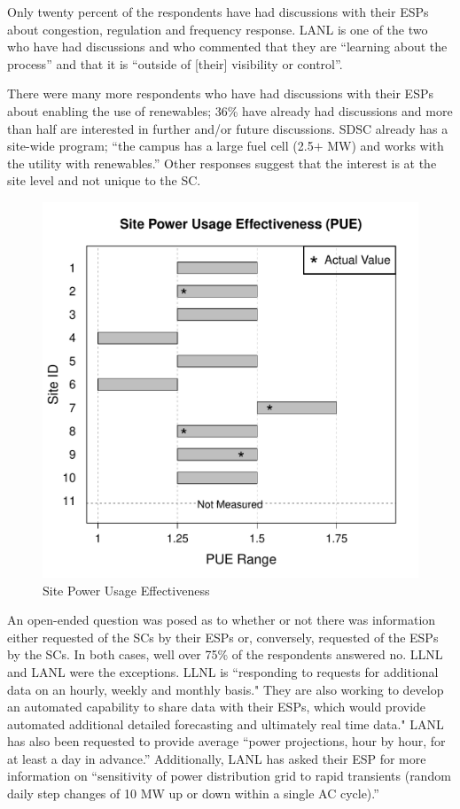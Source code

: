 Only twenty percent of the respondents have had discussions with their
ESPs about congestion, regulation and frequency
response. LANL is one of the two who have had discussions and who commented that
they are ``learning about the process'' and that it is ``outside of [their] visibility or control''.

There were many more respondents who have had discussions with their
ESPs about enabling the use of renewables; 36{\%}
have already had discussions and more than half are interested in further
and/or future discussions. SDSC already has a site-wide program; ``the
campus has a large fuel cell (2.5$+$ MW) and works with the utility with
renewables.'' Other responses suggest that the interest is at the site level
and not unique to the SC.

\begin{figure}
\begin{center}
\includegraphics[scale=0.45]{NewGraphs/PUE-Graph.pdf}
\caption{Site Power Usage Effectiveness}
\label{figPUE}
\end{center}
\end{figure}

An open-ended question was posed as to whether or not there was information
either requested of the SCs by their ESPs or,
conversely, requested of the ESPs by the SCs. In both cases, well
over 75{\%} of the respondents answered no. LLNL and LANL were the
exceptions. LLNL is ``responding to requests for additional data on an hourly, 
weekly and monthly basis." They are also working to develop an automated capability to share 
data with their ESPs, which would provide automated additional 
detailed forecasting and ultimately real time data."
LANL has also been requested to provide average ``power projections, hour by hour,
for at least a day in advance.'' Additionally, LANL has asked their ESP for
more information on ``sensitivity of power distribution grid to rapid
transients (random daily step changes of 10 MW up or down within a single AC
cycle).''

